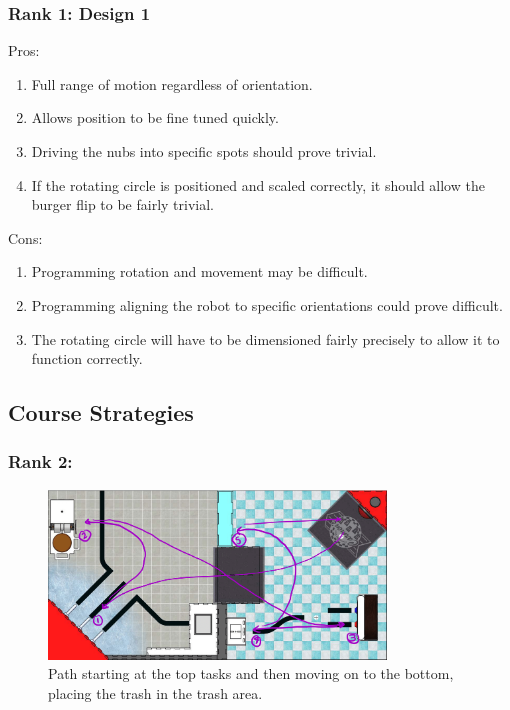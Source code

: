 \documentclass[12pt]{extarticle}
\begin{document}
\subsubsection*{Rank 1: Design 1}
Pros:
\begin{enumerate}
    \item Full range of motion regardless of orientation.
    \item Allows position to be fine tuned quickly.
    \item Driving the nubs into specific spots should prove trivial.
    \item If the rotating circle is positioned and scaled correctly, it should allow the burger flip to be fairly trivial.
\end{enumerate}
Cons:
\begin{enumerate}
    \item Programming rotation and movement may be difficult.
    \item Programming aligning the robot to specific orientations could prove difficult.
    \item The rotating circle will have to be dimensioned fairly precisely to allow it to function correctly.
\end{enumerate}

\subsection*{Course Strategies}
\subsubsection*{Rank 2:}
\begin{figure}[H]
    \centering
    \includegraphics[width=0.8\textwidth]{R01-1_ Individual Brainstorming-2.png}
    \caption{\centering Path starting at the top tasks and then moving on to the bottom, placing the trash in the trash area.}
    \label{fig:path2}
\end{figure}
\end{document}

